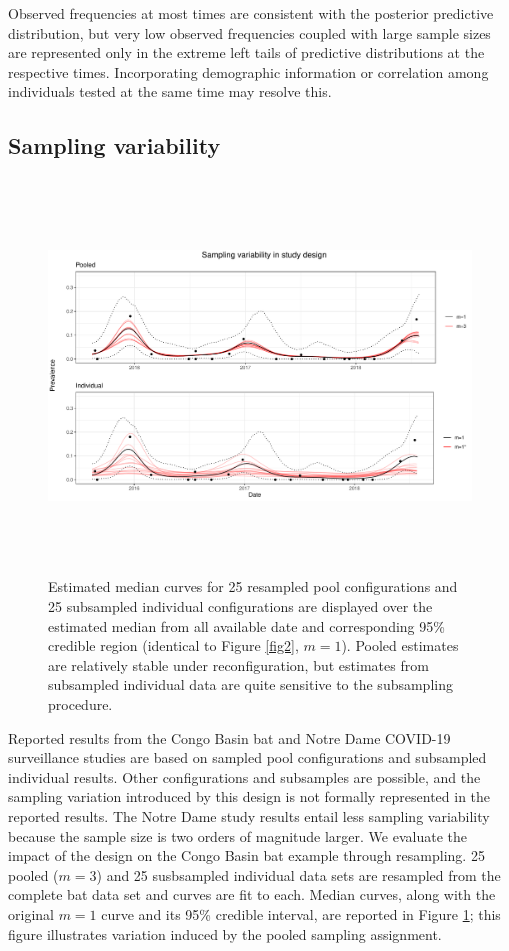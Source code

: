 \documentclass{article}
\begin{document}
Observed frequencies at most times are consistent with the posterior predictive distribution, but very low observed frequencies coupled with large sample sizes are represented only in the extreme left tails of predictive distributions at the respective times. Incorporating demographic information or correlation among individuals tested at the same time may resolve this.

\subsection{Sampling variability}

\begin{figure}[h]
\centerline{\includegraphics[width=500pt,height=296pt]{Figure4.pdf}}
\caption{Estimated median curves for 25 resampled pool configurations and 25 subsampled individual configurations are displayed over the estimated median from all available date and corresponding 95\% credible region (identical to Figure \ref{fig2}, $m=1$). Pooled estimates are relatively stable under reconfiguration, but estimates from subsampled individual data are quite sensitive to the subsampling procedure. \label{fig4}}
\end{figure}

Reported results from the Congo Basin bat and Notre Dame COVID-19 surveillance studies are based on sampled pool configurations and subsampled individual results. Other configurations and subsamples are possible, and the sampling variation introduced by this design is not formally represented in the reported results. The Notre Dame study results entail less sampling variability because the sample size is two orders of magnitude larger. We evaluate the impact of the design on the Congo Basin bat example through resampling. 25 pooled ($m=3$) and 25 susbsampled individual data sets are resampled from the complete bat data set and curves are fit to each. Median curves, along with the original $m=1$ curve and its 95\% credible interval, are reported in Figure \ref{fig4}; this figure illustrates variation induced by the pooled sampling assignment. 
\end{document}
